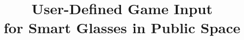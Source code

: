 \documentclass{sigchi}
\begin{document}
\title{User-Defined Game Input \\for Smart Glasses in Public Space}




\maketitle
\end{document}

